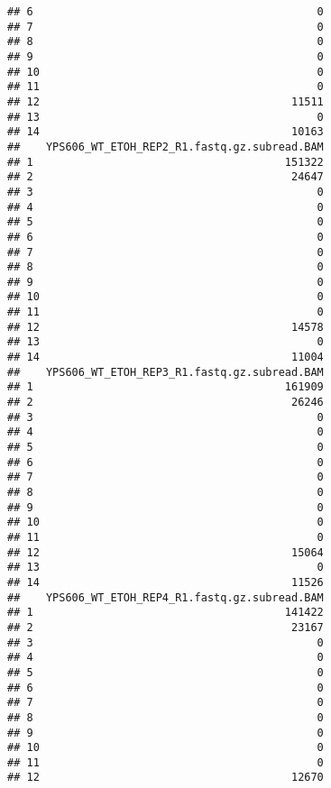 \documentclass[
]{book}
\begin{document}
\begin{verbatim}
## 6                                            0
## 7                                            0
## 8                                            0
## 9                                            0
## 10                                           0
## 11                                           0
## 12                                       11511
## 13                                           0
## 14                                       10163
##    YPS606_WT_ETOH_REP2_R1.fastq.gz.subread.BAM
## 1                                       151322
## 2                                        24647
## 3                                            0
## 4                                            0
## 5                                            0
## 6                                            0
## 7                                            0
## 8                                            0
## 9                                            0
## 10                                           0
## 11                                           0
## 12                                       14578
## 13                                           0
## 14                                       11004
##    YPS606_WT_ETOH_REP3_R1.fastq.gz.subread.BAM
## 1                                       161909
## 2                                        26246
## 3                                            0
## 4                                            0
## 5                                            0
## 6                                            0
## 7                                            0
## 8                                            0
## 9                                            0
## 10                                           0
## 11                                           0
## 12                                       15064
## 13                                           0
## 14                                       11526
##    YPS606_WT_ETOH_REP4_R1.fastq.gz.subread.BAM
## 1                                       141422
## 2                                        23167
## 3                                            0
## 4                                            0
## 5                                            0
## 6                                            0
## 7                                            0
## 8                                            0
## 9                                            0
## 10                                           0
## 11                                           0
## 12                                       12670

\end{verbatim}
\end{document}
